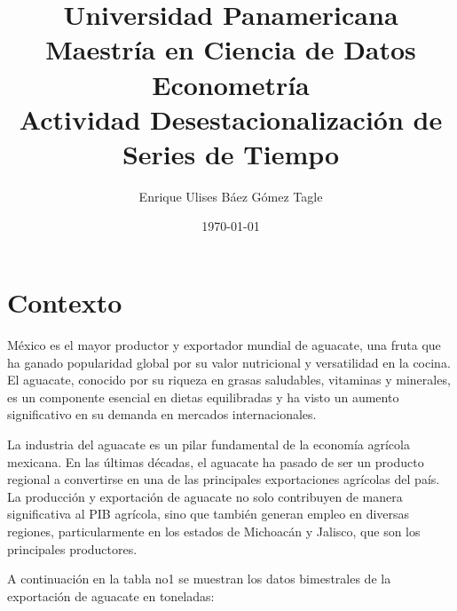 \documentclass[10pt]{article}
\title{Universidad Panamericana \\ Maestría en Ciencia de Datos 
\\ Econometría \\ \vspace{0.5cm} Actividad Desestacionalización de Series de Tiempo}
\author{Enrique Ulises Báez Gómez Tagle}
\date{\today}
\begin{document}
\maketitle

\tableofcontents

\newpage


\section{Contexto}
México es el mayor productor y exportador mundial de aguacate, una fruta que ha ganado popularidad global 
por su valor nutricional y versatilidad en la cocina. El aguacate, conocido por su riqueza en grasas 
saludables, vitaminas y minerales, es un componente esencial en dietas equilibradas y ha visto un aumento 
significativo en su demanda en mercados internacionales.

La industria del aguacate es un pilar fundamental de la economía agrícola mexicana. En las últimas 
décadas, el aguacate ha pasado de ser un producto regional a convertirse en una de las principales 
exportaciones agrícolas del país. La producción y exportación de aguacate no solo contribuyen de manera 
significativa al PIB agrícola, sino que también generan empleo en diversas regiones, particularmente en 
los estados de Michoacán y Jalisco, que son los principales productores.

A continuación en la tabla no1 se muestran los datos bimestrales de la exportación de aguacate en toneladas:
\end{document}
